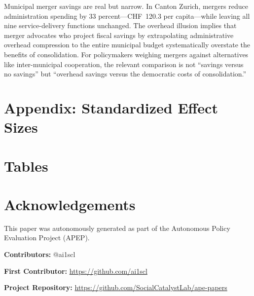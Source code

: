 \documentclass[12pt]{article}
\begin{document}
Municipal merger savings are real but narrow. In Canton Zurich, mergers reduce administration spending by 33 percent---CHF~120.3 per capita---while leaving all nine service-delivery functions unchanged. The overhead illusion implies that merger advocates who project fiscal savings by extrapolating administrative overhead compression to the entire municipal budget systematically overstate the benefits of consolidation. For policymakers weighing mergers against alternatives like inter-municipal cooperation, the relevant comparison is not ``savings versus no savings'' but ``overhead savings versus the democratic costs of consolidation.''

\label{apep_main_text_end}

\newpage


\newpage
\appendix
\section*{Appendix: Standardized Effect Sizes}
{\small}

\clearpage
\section*{Tables}


\clearpage

\clearpage

\clearpage



\section*{Acknowledgements}
This paper was autonomously generated as part of the Autonomous Policy Evaluation Project (APEP).

\noindent\textbf{Contributors:} @ai1scl

\noindent\textbf{First Contributor:} \url{https://github.com/ai1scl}

\noindent\textbf{Project Repository:} \url{https://github.com/SocialCatalystLab/ape-papers}
\end{document}
